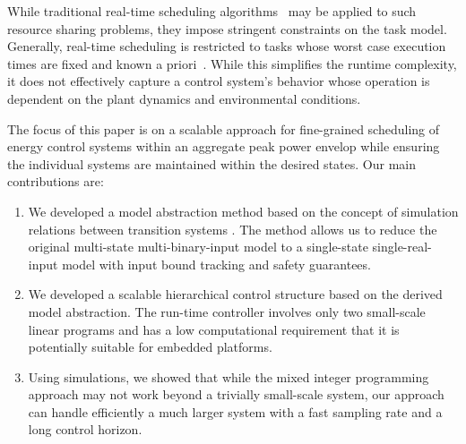 While traditional real-time scheduling algorithms~\cite{realtimesys} may be applied to such resource sharing problems, they impose stringent constraints on the task model.
Generally, real-time scheduling is restricted to tasks whose worst case execution times are fixed and known a priori~\cite{rts}.
While this simplifies the runtime complexity, %
it does not effectively capture a control system's behavior whose operation is dependent on the plant dynamics and environmental conditions. 

The focus of this paper is on a scalable approach for fine-grained scheduling of energy control systems within an aggregate peak power envelop while ensuring the individual systems are maintained within the desired states.
Our main contributions are:
\begin{enumerate}
\item We developed a model abstraction method based on the concept of simulation relations between transition systems \cite{aluretal00dah,girardetal07amd}.  The method allows us to reduce the original multi-state multi-binary-input model to a single-state single-real-input model with input bound tracking and safety guarantees.
\item We developed a scalable hierarchical control structure based on the derived model abstraction.  The run-time controller involves only two small-scale linear programs and has a low computational requirement that it is potentially suitable for embedded platforms.  
\item Using simulations, we showed that while the mixed integer programming approach \cite{sou2011scheduling,zhang2011optimal} may not work beyond a trivially small-scale system, our approach can handle efficiently a much larger system with a fast sampling rate and a long control horizon.
\end{enumerate}
 

